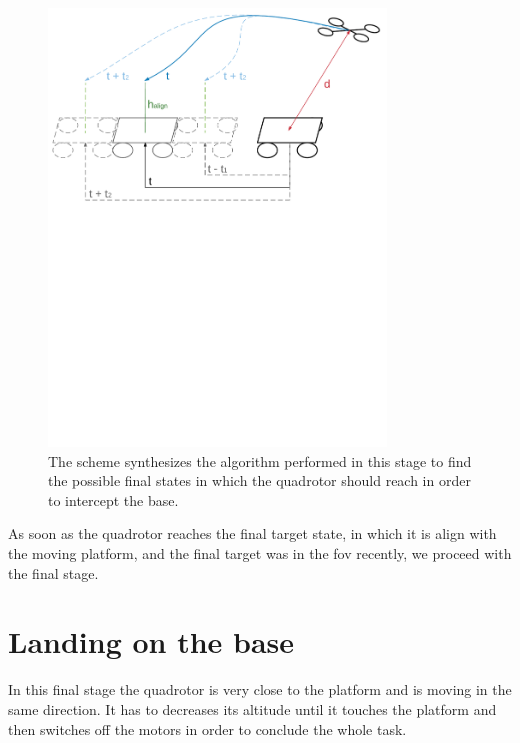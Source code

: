 \begin{figure}[!htbp]
    \centering
    \includegraphics[width=0.8\textwidth]{img/prediction_platform.pdf}
    \caption{The scheme synthesizes the algorithm performed in this stage to find the possible final states in which the quadrotor should reach in order to intercept the base. }
    \label{fig:align_platform}
\end{figure}

As soon as the quadrotor reaches the final target state, in which it is align with the moving platform, and the final target was in the fov recently, we proceed with the final stage.

\section{Landing on the base}
In this final stage the quadrotor is very close to the platform and is moving in the same direction. It has to decreases its altitude until it touches the platform and then switches off the motors in order to conclude the whole task.\\

